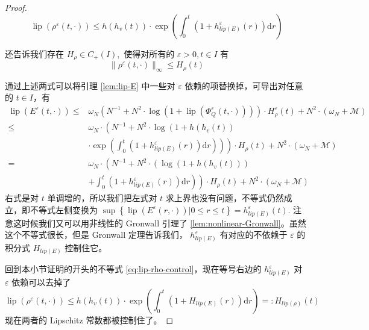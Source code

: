 \begin{proof}
\begin{equation}
    \label{eq:lip-rho-control}
    \operatorname{lip}\left(\rho^{\varepsilon}(t, \cdot)\right) \leqslant h\left(h_{v}(t)\right) \cdot \exp \left(\int_{0}^{t}\left(1+h^{\varepsilon}_{lip(E)}(r)\right) \mathrm{d} r\right)
\end{equation}

\boundcondition 还告诉我们存在 $H_{\rho} \in C_{+}(I),$ 使得对所有的  $\varepsilon>0, t \in I$ 有
\begin{equation}
    \|\rho^{\varepsilon}(t, \cdot)\|_{\infty} \leqslant H_{\rho}(t)
\end{equation}

通过上述两式可以将引理 \ref{lem:lip-E} 中一些对 $\varepsilon$ 依赖的项替换掉，可导出对任意的 $t \in I$，有
\[
\begin{aligned}
\operatorname{lip}\left(E^{\varepsilon}(t, \cdot)\right) \leqslant & \omega_{N}\left(N^{-1}+N^{2} \cdot \log \left(1+\operatorname{lip}\left(\Phi_{Q}^{\varepsilon}(t, \cdot)\right)\right)\right) \cdot H_{\rho}^{\varepsilon}(t) +N^{2} \cdot\left(\omega_{N}+\mathcal{M}\right) \\
\leqslant & \omega_{N} \cdot\left(N^{-1}+N^{2} \cdot \log \left(1+h\left(h_{v}(t)\right)\right.\right.\\
&\left.\left.\cdot \exp \left(\int_{0}^{t}\left(1+h^{\varepsilon}_{lip(E)}(r)\right) \mathrm{d} r\right)\right)\right) \cdot H_{\rho}(t)+N^{2} \cdot\left(\omega_{N}+\mathcal{M}\right) \\
=& \omega_{N} \cdot\left(N^{-1}+N^{2} \cdot\left(\log \left(1+h\left(h_{v}(t)\right)\right)\right.\right.\\
&\left.\left.+\int_{0}^{t}\left(1+h^{\varepsilon}_{lip(E)}(r)\right) \mathrm{d} r\right)\right) \cdot H_{\rho}(t)+N^{2} \cdot\left(\omega_{N}+\mathcal{M}\right)
\end{aligned}
\]
右式是对 $t$ 单调增的，所以我们把左式对 $t$ 求上界也没有问题，不等式仍然成立，即不等式左侧变换为 $\sup \left\{\operatorname{lip}\left(E^{\varepsilon}(r, \cdot)\right) | 0 \leqslant r \leqslant t\right\}=h^{\varepsilon}_{lip(E)}(t) .$ 注意这时候我们又可以用非线性的 Gronwall 引理了 \ref{lem:nonlinear-Gronwall}。虽然这个不等式很长，但是 Gronwall 定理告诉我们， $h^{\varepsilon}_{lip(E)}$ 有对应的不依赖于 $\varepsilon$ 的积分式 $H_{lip(E)}$ 控制住它。 

回到本小节证明的开头的不等式 \ref{eq:lip-rho-control}，现在等号右边的 $h^{\varepsilon}_{lip(E)}$ 对 $\varepsilon$ 依赖可以去掉了
\[
\operatorname{lip}\left(\rho^{\varepsilon}(t, \cdot)\right) \leqslant h\left(h_{v}(t)\right) \cdot \exp \left(\int_{0}^{t}\left(1+H_{lip(E)}(r)\right) \mathrm{d} r\right)=: H_{lip(\rho)}(t)
\]
现在两者的 Lipschitz 常数都被控制住了。


\end{proof}


